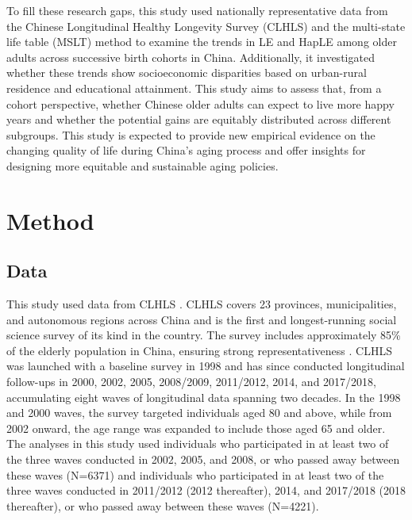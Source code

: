 \documentclass[12pt, a4paper]{article}
\begin{document}
To fill these research gaps, this study used nationally representative data from the Chinese Longitudinal Healthy Longevity Survey (CLHLS) and the multi-state life table (MSLT) method to examine the trends in LE and HapLE among older adults across successive birth cohorts in China. Additionally, it investigated whether these trends show socioeconomic disparities based on urban-rural residence and educational attainment. This study aims to assess that, from a cohort perspective, whether Chinese older adults can expect to live more happy years and whether the potential gains are equitably distributed across different subgroups. This study is expected to provide new empirical evidence on the changing quality of life during China's aging process and offer insights for designing more equitable and sustainable aging policies.


\section{Method}
\subsection{Data}
This study used data from CLHLS \autocite{centerforhealthyaginganddevelopmentstudies.2020.chinese}. CLHLS covers 23 provinces, municipalities, and autonomous regions across China and is the first and longest-running social science survey of its kind in the country. The survey includes approximately 85\% of the elderly population in China, ensuring strong representativeness \autocite{gu.2008.general,zeng.2008.introduction}. CLHLS was launched with a baseline survey in 1998 and has since conducted longitudinal follow-ups in 2000, 2002, 2005, 2008/2009, 2011/2012, 2014, and 2017/2018, accumulating eight waves of longitudinal data spanning two decades. In the 1998 and 2000 waves, the survey targeted individuals aged 80 and above, while from 2002 onward, the age range was expanded to include those aged 65 and older. The analyses in this study used individuals who participated in at least two of the three waves conducted in 2002, 2005, and 2008, or who passed away between these waves (N=6371) and individuals who participated in at least two of the three waves conducted in 2011/2012 (2012 thereafter), 2014, and 2017/2018 (2018 thereafter), or who passed away between these waves (N=4221).
\end{document}
